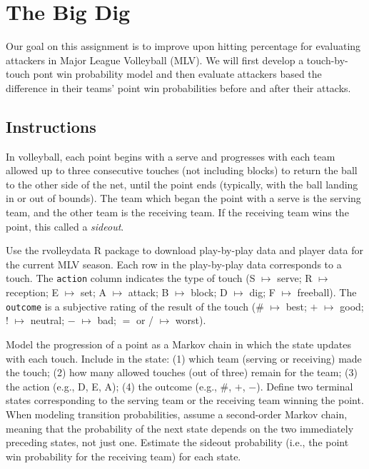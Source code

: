 \documentclass{article}
\begin{document}
  \section*{\sc The Big Dig}

    Our goal on this assignment is to improve upon hitting percentage for evaluating attackers in Major League Volleyball (MLV). We will first develop a touch-by-touch pont win probability model and then evaluate attackers based the difference in their teams' point win probabilities before and after their attacks.

    \subsection*{\sc Instructions}

      In volleyball, each point begins with a serve and progresses with each team allowed up to three consecutive touches (not including blocks) to return the ball to the other side of the net, until the point ends (typically, with the ball landing in or out of bounds). The team which began the point with a serve is the serving team, and the other team is the receiving team. If the receiving team wins the point, this called a {\it sideout}.

      Use the rvolleydata R package to download play-by-play data and player data for the current MLV season. Each row in the play-by-play data corresponds to a touch. The \texttt{action} column indicates the type of touch (S $\mapsto$ serve; R $\mapsto$ reception; E $\mapsto$ set; A $\mapsto$ attack; B $\mapsto$ block; D $\mapsto$ dig; F $\mapsto$ freeball). The \texttt{outcome} is a subjective rating of the result of the touch (\# $\mapsto$ best; $+$ $\mapsto$ good; ! $\mapsto$ neutral; $-$ $\mapsto$ bad; $=$ or / $\mapsto$ worst).
      
      Model the progression of a point as a Markov chain in which the state updates with each touch. Include in the state: (1) which team (serving or receiving) made the touch; (2) how many allowed touches (out of three) remain for the team; (3) the action (e.g., D, E, A); (4) the outcome (e.g., \#, $+$, $-$). Define two terminal states corresponding to the serving team or the receiving team winning the point. When modeling transition probabilities, assume a second-order Markov chain, meaning that the probability of the next state depends on the two immediately preceding states, not just one. Estimate the sideout probability (i.e., the point win probability for the receiving team) for each state.
\end{document}
